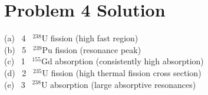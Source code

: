 \documentclass{report}
\newcommand{\tab}{\-\hspace{1.5cm}}
\begin{document}
\section*{Problem 4 Solution}


\tab\tab (a) \, 4 \, $^{238}$U fission (high fast region) 					\\
\tab\tab (b) \, 5 \, $^{239}$Pu fission (resonance peak)					\\
\tab\tab (c) \, 1 \, $^{155}$Gd absorption (consistently high absorption)	\\
\tab\tab (d) \, 2 \, $^{235}$U fission (high thermal fission cross section)	\\
\tab\tab (e) \, 3 \, $^{238}$U absorption (large absorptive resonances)
\end{document}
